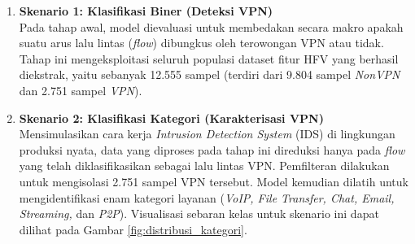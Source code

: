 \begin{enumerate}
    \item \textbf{Skenario 1: Klasifikasi Biner (Deteksi VPN)} \\
    Pada tahap awal, model dievaluasi untuk membedakan secara makro apakah suatu arus lalu lintas (\textit{flow}) dibungkus oleh terowongan VPN atau tidak. Tahap ini mengeksploitasi seluruh populasi dataset fitur HFV yang berhasil diekstrak, yaitu sebanyak 12.555 sampel (terdiri dari 9.804 sampel \textit{NonVPN} dan 2.751 sampel \textit{VPN}).

    \item \textbf{Skenario 2: Klasifikasi Kategori (Karakterisasi VPN)} \\
    Mensimulasikan cara kerja \textit{Intrusion Detection System} (IDS) di lingkungan produksi nyata, data yang diproses pada tahap ini direduksi hanya pada \textit{flow} yang telah diklasifikasikan sebagai lalu lintas VPN. Pemfilteran dilakukan untuk mengisolasi 2.751 sampel VPN tersebut. Model kemudian dilatih untuk mengidentifikasi enam kategori layanan (\textit{VoIP, File Transfer, Chat, Email, Streaming,} dan \textit{P2P}). Visualisasi sebaran kelas untuk skenario ini dapat dilihat pada Gambar \ref{fig:distribusi_kategori}.


\end{enumerate}
